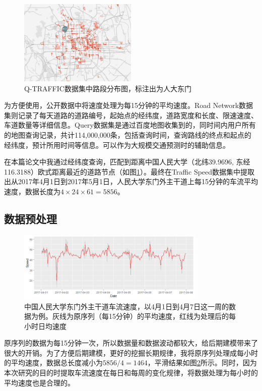 \documentclass[lang=cn,11pt,a4paper]{elegantpaper}
\begin{document}
\begin{figure}[H]
  \centering
  \includegraphics[width=0.5\textwidth]{image/road_map.png}
  \caption{Q-TRAFFIC数据集中路段分布图，标注出为人大东门}
  \label{fig1}
\end{figure}

为方便使用，公开数据中将速度处理为每15分钟的平均速度。Road Network数据集则记录了每天道路的道路编号，起始点的经纬度，道路宽度和长度、限速速度、车道数量等详细信息。Query数据集是通过百度地图收集到的，同时间内用户所有的地图查询记录，共计114,000,000条，包括查询时间，查询路线的终点和起点的经纬度，预计所用时间等信息。可以作为大规模交通预测时的辅助信息。




在本篇论文中我通过经纬度查询，匹配到距离中国人民大学（北纬39.9696, 东经116.3188）欧式距离最近的道路节点（如图\ref{fig1}）。最终在Traffic Speed数据集中提取出从2017年4月1日到2017年5月1日，人民大学东门外主干道上每15分钟的车流平均速度，数据长度为$4\times24\times61=5856$。

\subsection{数据预处理}
\begin{figure}[htbp]
  \centering
  \includegraphics[width=0.8\textwidth]{image/filter.png}
  
  \caption{中国人民大学东门外主干道车流速度，以4月1日到4月7日这一周的数据为例。灰线为原序列（每15分钟）的平均速度，红线为处理后的每小时日均速度}
\label{fig2}
\end{figure}

原序列的数据为每15分钟一次，所以数据量和数据波动都较大，给后期建模带来了很大的开销。为了方便后期建模，更好的挖掘长期规律，我将原序列处理成每小时的平均速度，数据总长度减小为$5856/4=1464$，平滑结果如图\ref{fig2}所示。同时，因为本次研究的目的时提取车流速度在每日和每周的变化规律，将数据处理为每小时的平均速度也是合理的。
\end{document}
